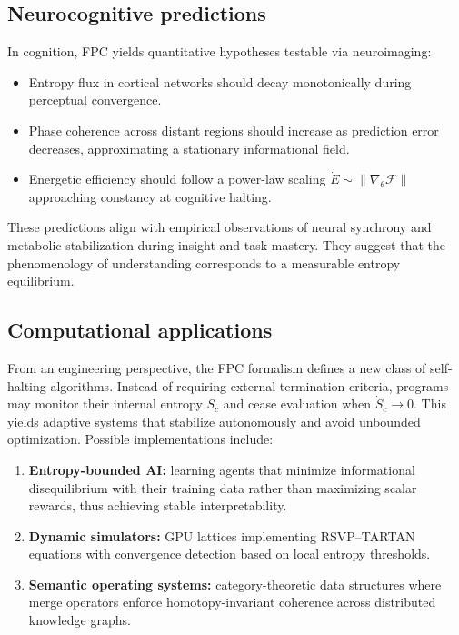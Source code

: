 \documentclass[12pt,a4paper]{article}
\theoremstyle{plain}
\begin{document}
\subsection{Neurocognitive predictions}
In cognition, FPC yields quantitative hypotheses testable via neuroimaging:

\begin{itemize}[nosep]
  \item Entropy flux in cortical networks should decay monotonically during perceptual convergence.
  \item Phase coherence across distant regions should increase as prediction error decreases, approximating a stationary informational field.
  \item Energetic efficiency should follow a power-law scaling $\dot{E}\!\sim\!\|\nabla_\theta\mathcal{F}\|$ approaching constancy at cognitive halting.
\end{itemize}

These predictions align with empirical observations of neural synchrony and metabolic stabilization during insight and task mastery.  
They suggest that the phenomenology of understanding corresponds to a measurable entropy equilibrium.

\subsection{Computational applications}
From an engineering perspective, the FPC formalism defines a new class of self-halting algorithms.
Instead of requiring external termination criteria, programs may monitor their internal entropy $S_c$ and cease evaluation when $\dot{S}_c\!\to\!0$.
This yields adaptive systems that stabilize autonomously and avoid unbounded optimization.
Possible implementations include:

\begin{enumerate}[nosep]
  \item \textbf{Entropy-bounded AI:} learning agents that minimize informational disequilibrium with their training data rather than maximizing scalar rewards, thus achieving stable interpretability.
  \item \textbf{Dynamic simulators:} GPU lattices implementing RSVP–TARTAN equations with convergence detection based on local entropy thresholds.
  \item \textbf{Semantic operating systems:} category-theoretic data structures where merge operators enforce homotopy-invariant coherence across distributed knowledge graphs.
\end{enumerate}
\end{document}
